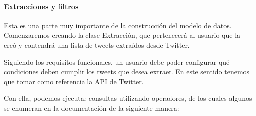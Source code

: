 \paragraph{Extracciones y filtros}
Esta es una parte muy importante de la construcción del modelo de datos. Comenzaremos creando la clase Extracción, que pertenecerá al usuario que la creó y contendrá una lista de tweets extraídos desde Twitter.

Siguiendo los requisitos funcionales, un usuario debe poder configurar qué condiciones deben cumplir los tweets que desea extraer. En este sentido tenemos que tomar como referencia la API de Twitter. 

Con ella, podemos ejecutar consultas utilizando operadores, de los cuales algunos se enumeran en la documentación de la siguiente manera:


